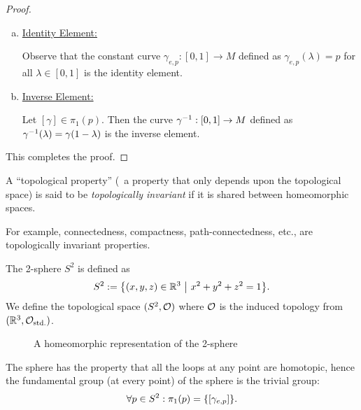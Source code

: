 \begin{proof}
\begin{enumerate}[(a)]
		\item \uline{Identity Element:}

		      Observe that the constant curve \(\gamma_{e, p}: [0, 1] \to M\) defined as \(\gamma_{e, p}(\lambda) = p\) for all \(\lambda \in [0, 1]\) is the identity element.

		\item \uline{Inverse Element:}

		      Let \([\gamma] \in \pi_1(p)\). Then the curve \(\gamma^{-1}: [0, 1] \to M\) defined as \(\gamma^{-1}(\lambda) = \gamma(1 - \lambda)\) is the inverse element.
	\end{enumerate}
	This completes the proof.
\end{proof}

\begin{remark}
	A ``topological property'' (\ie\ a property that only depends upon the topological space) is said to be \emph{topologically invariant} if it is shared between homeomorphic spaces.

	\noindent 	For example, connectedness, compactness, path-connectedness, etc., are topologically invariant properties.
\end{remark}

\begin{example}[2-sphere \(S^2\)]
	The 2-sphere \(S^2\) is defined as
	\begin{equation}
		S^2 := \qty{(x, y, z) \in \mathbb R^3 \ \middle|\ x^2 + y^2 + z^2 = 1}. \label{eq:2_sphere}
	\end{equation}
	We define the topological space \((S^2, \mathcal{O})\) where \(\mathcal{O}\) is the induced topology from \((\mathbb R^3, \mathcal{O}_{\text{std.}})\).
	\begin{figure}[H]
		\centering
		\caption{A homeomorphic representation of the 2-sphere}
		\label{fig:2_sphere}
	\end{figure} \noindent
	The sphere has the property that all the loops at any point are homotopic, hence the
	fundamental group (at every point) of the sphere is the trivial group:
	\begin{equation}
		\forall p \in S^2: \pi_1(p) = \qty{[\gamma_{e, p}]}. \label{eq:fundamental_group_sphere}
	\end{equation}
\end{example}

